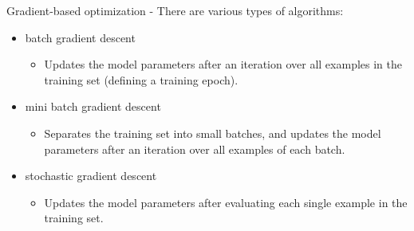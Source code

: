 \begin{frame}[t,allowframebreaks]{Gradient-based optimization -}
    There are various types of 
    algorithms:\\
    \begin{itemize}
        \item   
            \Gls{batch gradient descent}\\
            \begin{itemize}
                \item
                    Updates the model parameters 
                    after an iteration over all examples in the training set
                    (defining a training \gls{epoch}).
            \end{itemize}
        \item 
            \Gls{mini batch gradient descent}\\
            \begin{itemize}
                \item   
                    Separates the training set into small batches,
                    and updates the model parameters after an iteration
                    over all examples of each batch.
            \end{itemize}
        \item 
            \Gls{stochastic gradient descent}\\
            \begin{itemize}
                \item   
                    Updates the model parameters after evaluating each
                    single example in the training set.\\
            \end{itemize}
    \end{itemize}

    \framebreak



\end{frame}

